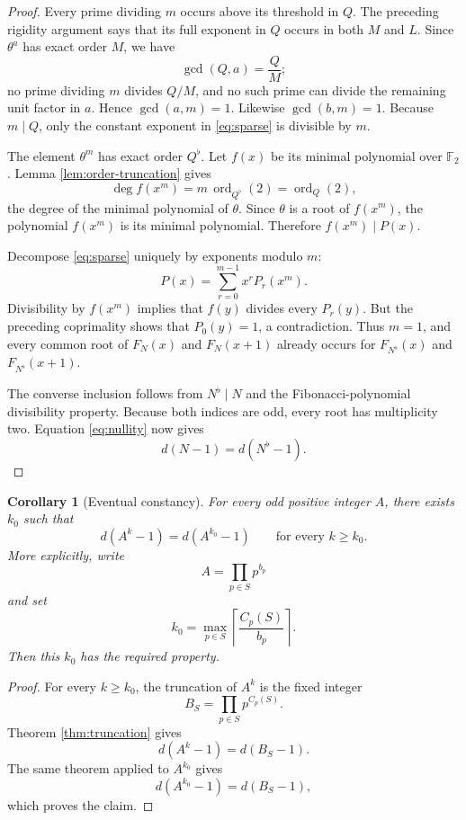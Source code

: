 \documentclass[a4paper]{article}
\newtheorem{corollary}[theorem]{Corollary}
\newcommand{\F}{\mathbb{F}}
\newcommand{\ord}[2][]{\operatorname{ord}_{#1}\!\left(#2\right)}
\begin{document}
\begin{proof}
	Every prime dividing $m$ occurs above its threshold in $Q$.
	The preceding rigidity argument says that its full exponent in $Q$ occurs in both $M$ and $L$.
	Since $\theta^a$ has exact order $M$, we have
	\[
		\gcd(Q,a)=\frac{Q}{M};
	\]
	no prime dividing $m$ divides $Q/M$, and no such prime can divide the remaining unit factor in $a$.
	Hence $\gcd(a,m)=1$.
	Likewise $\gcd(b,m)=1$.
	Because $m\mid Q$, only the constant exponent in \eqref{eq:sparse} is divisible by $m$.

	The element $\theta^m$ has exact order $Q^\flat$.
	Let $f(x)$ be its minimal polynomial over $\F_2$.
	Lemma \ref{lem:order-truncation} gives
	\[
		\deg f(x^m)
		=
		m\,\ord[Q^\flat]{2}
		=
		\ord[Q]{2},
	\]
	the degree of the minimal polynomial of $\theta$.
	Since $\theta$ is a root of $f(x^m)$, the polynomial $f(x^m)$ is its minimal polynomial.
	Therefore $f(x^m)\mid P(x)$.

	Decompose \eqref{eq:sparse} uniquely by exponents modulo $m$:
	\[
		P(x)=\sum_{r=0}^{m-1}x^rP_r(x^m).
	\]
	Divisibility by $f(x^m)$ implies that $f(y)$ divides every $P_r(y)$.
	But the preceding coprimality shows that $P_0(y)=1$, a contradiction.
	Thus $m=1$, and every common root of $F_N(x)$ and $F_N(x+1)$ already occurs for $F_{N^\flat}(x)$ and $F_{N^\flat}(x+1)$.

	The converse inclusion follows from $N^\flat\mid N$ and the Fibonacci-polynomial divisibility property.
	Because both indices are odd, every root has multiplicity two.
	Equation \eqref{eq:nullity} now gives
	\[
		d(N-1)=d(N^\flat-1).
	\]
\end{proof}

\begin{corollary}[Eventual constancy]\label{cor:eventual}
	For every odd positive integer $A$, there exists $k_0$ such that
	\[
		d(A^k-1)=d(A^{k_0}-1)
		\qquad\text{for every }k\geq k_0.
	\]
	More explicitly, write
	\[
		A=\prod_{p\in S}p^{b_p}
	\]
	and set
	\[
		k_0=
		\max_{p\in S}
		\left\lceil\frac{C_p(S)}{b_p}\right\rceil.
	\]
	Then this $k_0$ has the required property.
\end{corollary}

\begin{proof}
	For every $k\geq k_0$, the truncation of $A^k$ is the fixed integer
	\[
		B_S=\prod_{p\in S}p^{C_p(S)}.
	\]
	Theorem \ref{thm:truncation} gives
	\[
		d(A^k-1)=d(B_S-1).
	\]
	The same theorem applied to $A^{k_0}$ gives
	\[
		d(A^{k_0}-1)=d(B_S-1),
	\]
	which proves the claim.
\end{proof}
\end{document}
